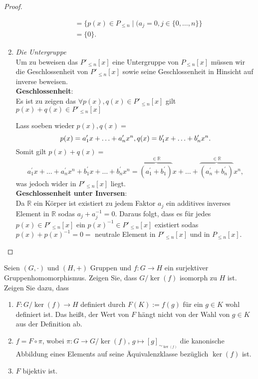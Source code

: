 \documentclass{../problemset}
\begin{document}
\begin{problem}
\begin{proof}
\begin{enumerate}
\begin{align}
			                                 & = \{p(x) \in P_{\le n} \mid (a_j = 0, j \in \{0, \ldots, n\}\}                                                                    \\
			                                 & = \{0\}.
		      \end{align}
		      \checkmark
		\item \textit{Die Untergruppe} \\
		      Um zu beweisen das $P'_{\le n}[x]$ eine Untergruppe von $P_{\le n}[x]$ müssen wir die Geschlossenheit von $P'_{\le n}[x]$ sowie seine Geschlossenheit in Hinsicht auf inverse beweisen. \\
		      \textbf{Geschlossenheit}: \\
		      Es ist zu zeigen das $\forall p(x),q(x) \in P'_{\le n}[x]$ gilt $p(x) + q(x) \in P'_{\le n}[x]$

		      Lass soeben wieder $p(x), q(x) =$ \[
			      p(x) = a^\prime_1x + \ldots + a^\prime_nx^n, \\
			      q(x) = b^\prime_1x + \ldots + b^\prime_nx^n.
		      \]
		      Somit gilt $p(x) + q(x) =$ \[
			      a^\prime_1x + \ldots + a^\prime_nx^n + b^\prime_1x + \ldots + b^\prime_nx^n =
			      \overbrace{(a^\prime_1+b^\prime_1)}^{\in \mathbb{R}}x + \ldots + \overbrace{(a^\prime_n+b^\prime_n)}^{\in \mathbb{R}}x^n,
		      \] was jedoch wider in $P'_{\le n}[x]$ liegt.
		      \checkmark
		      \\
		      \textbf{Geschlossenheit unter Inversen}: \\
		      Da $\mathbb{R}$ ein Körper ist existiert zu jedem Faktor $a_j$ ein additives inverses Element in $\mathbb{R}$ sodas $a_j + a_j^{-1} = 0$.
		      Daraus folgt, dass es für jedes $p(x) \in P'_{\le n}[x]$ ein $p(x)^{-1} \in P'_{\le n}[x]$ existiert sodas $p(x) + p(x)^{-1} = 0 =$ neutrale Element in $P'_{\le n}[x]$ und in $P_{\le n}[x]$.
		      \checkmark
	\end{enumerate}


\end{proof}

\end{problem}

\begin{problem}
Seien $(G, \cdot)$ und $(H, +)$ Gruppen und $f: G \to H$ ein surjektiver Gruppenhomomorphismus. Zeigen Sie, dass $G/\ker(f)$ isomorph zu $H$ ist. Zeigen Sie dazu, dass
\begin{enumerate}
	\item $F: G/\ker(f) \to H$ definiert durch $F(K) := f(g)$ für ein $g \in K$ wohl definiert ist. Das heißt, der Wert von $F$ hängt nicht von der Wahl von $g \in K$ aus der Definition ab.
	\item $f = F \circ \pi$, wobei $\pi: G \to G/\ker(f)$, $g \mapsto [g]_{\sim_{\ker(f)}}$ die kanonische Abbildung eines Elements auf seine Äquivalenzklasse bezüglich $\ker(f)$ ist.
	\item $F$ bijektiv ist.
\end{enumerate}

\end{problem}
\end{document}
